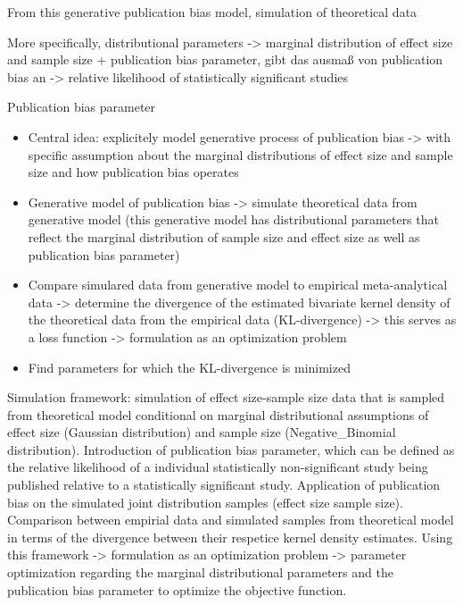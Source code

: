 \documentclass[
  12pt,
]{scrartcl}
\providecommand{\tightlist}{%
  \setlength{\itemsep}{0pt}\setlength{\parskip}{0pt}}\usepackage{longtable,booktabs,array}
\begin{document}
From this generative publication bias model, simulation of theoretical
data

More specifically, distributional parameters -\textgreater{} marginal
distribution of effect size and sample size + publication bias
parameter, gibt das ausmaß von publication bias an -\textgreater{}
relative likelihood of statistically significant studies

Publication bias parameter

\begin{itemize}
\tightlist
\item
  Central idea: explicitely model generative process of publication bias
  -\textgreater{} with specific assumption about the marginal
  distributions of effect size and sample size and how publication bias
  operates
\item
  Generative model of publication bias -\textgreater{} simulate
  theoretical data from generative model (this generative model has
  distributional parameters that reflect the marginal distribution of
  sample size and effect size as well as publication bias parameter)
\item
  Compare simulared data from generative model to empirical
  meta-analytical data -\textgreater{} determine the divergence of the
  estimated bivariate kernel density of the theoretical data from the
  empirical data (KL-divergence) -\textgreater{} this serves as a loss
  function -\textgreater{} formulation as an optimization problem
\item
  Find parameters for which the KL-divergence is minimized
\end{itemize}

Simulation framework: simulation of effect size-sample size data that is
sampled from theoretical model conditional on marginal distributional
assumptions of effect size (Gaussian distribution) and sample size
(Negative\_Binomial distribution). Introduction of publication bias
parameter, which can be defined as the relative likelihood of a
individual statistically non-significant study being published relative
to a statistically significant study. Application of publication bias on
the simulated joint distribution samples (effect size sample size).
Comparison between empirial data and simulated samples from theoretical
model in terms of the divergence between their respetice kernel density
estimates. Using this framework -\textgreater{} formulation as an
optimization problem -\textgreater{} parameter optimization regarding
the marginal distributional parameters and the publication bias
parameter to optimize the objective function.
\end{document}
